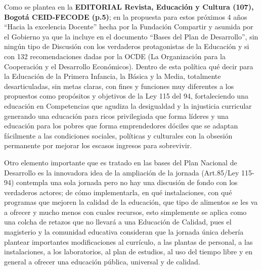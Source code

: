 \documentclass[10pt,twoside]{article}
\begin{document}
Como se plantea en la \textbf{EDITORIAL Revista, Educación y Cultura (107), Bogotá CEID-FECODE (p.5)}; en la propuesta para estos próximos 4 años “Hacia la excelencia Docente” hecha por la Fundación Compartir y asumida por el Gobierno ya que la incluye en el documento “Bases del Plan de Desarrollo”, sin ningún tipo de Discusión con los verdaderos protagonistas de la Educación y si con 132 recomendaciones dadas por la OCDE (La Organización para la Cooperación y el Desarrollo Económicos). Dentro de esta política qué decir para la Educación de la Primera Infancia, la Básica y la Media, totalmente desarticuladas, sin metas claras, con fines y funciones muy diferentes a los propuestos como propósitos y  objetivos de la Ley 115 del 94, fortaleciendo una educación en Competencias que agudiza la desigualdad y la injusticia curricular generando una educación para ricos privilegiada que forma líderes  y una educación para los pobres que forma emprendedores dóciles que se adaptan fácilmente a las condiciones sociales, políticas y culturales con la obsesión permanente por mejorar los escasos ingresos para sobrevivir.

Otro elemento importante que es tratado en las bases del Plan Nacional de Desarrollo es la innovadora idea de la ampliación de la jornada (Art.85/Ley 115-94) contempla una sola jornada pero no hay una discusión de fondo con los verdaderos actores; de cómo implementarla, en qué instalaciones, con qué programas que mejoren la calidad de la educación, que tipo de alimentos se les va a ofrecer y mucho menos con cuales recursos, esto simplemente se  aplica como una colcha de retazos que no llevará a una Educación de Calidad, pues el magisterio y la comunidad educativa consideran que la jornada única  debería plantear importantes modificaciones al currículo, a las plantas de personal, a las instalaciones,  a los laboratorios,  al plan de estudios,  al uso del tiempo libre y en general  a ofrecer una educación pública, universal y de calidad.
\end{document}
